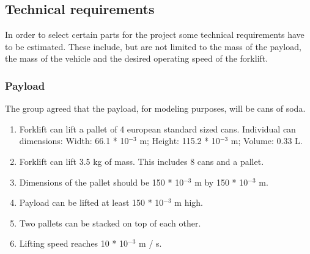 \documentclass{article}
\begin{document}
    \subsection{Technical requirements}
        In order to select certain parts for the project some technical requirements 
        have to be estimated. These include, but are not limited to the mass of the 
        payload, the mass of the vehicle and the desired operating speed of the 
        forklift.

        \subsubsection{Payload} %
           The group agreed that the payload, for modeling purposes, will be cans of soda.
           \begin{center}
                \begin{enumerate}
                    \item Forklift can lift a pallet of 4 european standard sized cans. Individual can dimensions: Width: 66.1 * 10$^{-3}$ m; Height: 115.2 * 10$^{-3}$ m; Volume: 0.33 L. %
                    \item Forklift can lift  3.5 kg of mass. This includes 8 cans and a pallet. %
                    \item Dimensions of the pallet should be 150 * 10$^{-3}$ m by 150 * 10$^{-3}$ m. %
                    \item Payload can be lifted at least 150 * 10$^{-3}$ m high. %
                    \item Two pallets can be stacked on top of each other.
                    \item Lifting speed reaches 10 * 10$^{-3}$ m / s. %
                \end{enumerate}
            \end{center}
\end{document}
